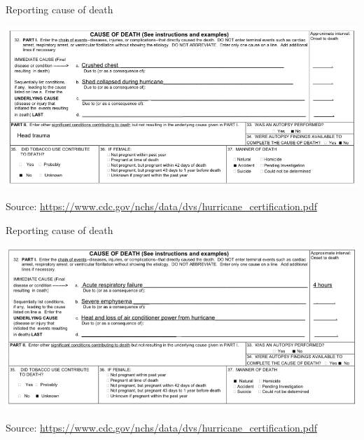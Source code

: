 \documentclass[ignorenonframetext,]{beamer}
\begin{document}
\begin{frame}{Reporting cause of death}

\begin{center}\includegraphics[width=\textwidth]{figures/cdc_direct_death} \end{center}

\footnotesize Source:
\url{https://www.cdc.gov/nchs/data/dvs/hurricane_certification.pdf}

\end{frame}

\begin{frame}{Reporting cause of death}

\begin{center}\includegraphics[width=\textwidth]{figures/cdc_indirect_death} \end{center}

\footnotesize Source:
\url{https://www.cdc.gov/nchs/data/dvs/hurricane_certification.pdf}

\end{frame}
\end{document}
